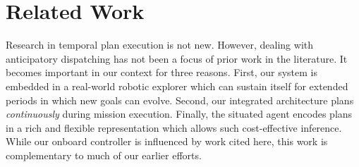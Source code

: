 \section{Related Work}
\label{sec:related}


Research in temporal plan execution is not new. However, dealing with
anticipatory dispatching has not been a focus of prior work in the
literature. It becomes important in our context for three
reasons. First, our system is embedded in a real-world robotic
explorer which can sustain itself for extended periods in which new
goals can evolve. Second, our integrated architecture \rx
\cite{mcgann08bdup,py10dup,rajan12dup} plans \emph{continuously}
during mission execution. Finally, the situated agent encodes plans in
a rich and flexible representation which allows such cost-effective
inference.  While our onboard controller is influenced by work cited
here, this work is complementary to much of our earlier efforts.



